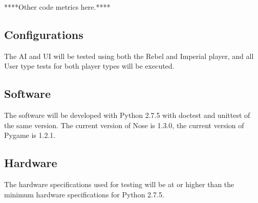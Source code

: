 \documentclass[report]{article}
\begin{document}
****Other code metrics here.****

\subsection{Configurations}
The AI and UI will be tested using both the Rebel and Imperial player, and all User type tests for both player types will be executed.

\subsection{Software}
The software will be developed with Python 2.7.5 with doctest and unittest of the same version. The current version of Nose is 1.3.0, the current version of Pygame is 1.2.1.

\subsection{Hardware}
The hardware specifications used for testing will be at or higher than the minimum hardware specifications for Python 2.7.5.

\end{document}
